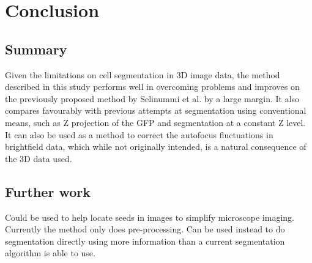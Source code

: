 
\chapter{Conclusion}

\ifpdf
    \graphicspath{{Chapter6/Figs/Raster/}{Chapter6/Figs/PDF/}{Chapter6/Figs/}}
\else
    \graphicspath{{Chapter6/Figs/Vector/}{Chapter6/Figs/}}
\fi

\section{Summary}

Given the limitations on cell segmentation in 3D image data, the method described in this study performs well in overcoming problems and improves on the previously proposed method by Selinummi et al. by a large margin. It also compares favourably with previous attempts at segmentation using conventional means, such as Z projection of the GFP and segmentation at a constant Z level. It can also be used as a method to correct the autofocus fluctuations in brightfield data, which while not originally intended, is a natural consequence of the 3D data used.

\section{Further work}

Could be used to help locate seeds in images to simplify microscope imaging.
Currently the method only does pre-processing. Can be used instead to do segmentation directly using more information than a current segmentation algorithm is able to use.
